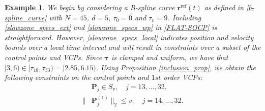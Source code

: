 \documentclass[journal,10pt]{IEEEtran}
\newtheorem{example}{\bfseries Example}%
\newcommand{\vect}[1]{\boldsymbol{\mathbf{#1}}}
\newif\ifdraft
\newcommand{\XX}[1]{\ifdraft{\color{red}[{\bf XX}: #1]}\fi}
\newcommand{\VF}[1]{\ifdraft{\color{blue}[{\bf VF}: #1]}\fi}
\begin{document}
\begin{example}
%

We begin by considering a B-spline curve $\vect{r}^{\text{ref}}(t)$ as defined in \eqref{b-spline_curve} with $N= 45$, $d=5$, $\tau_0 = 0$ and $\tau_v = 9$. Including \eqref{slowzone_specs_ext} and \eqref{slowzone_specs_wp} in \eqref{FLAT-SOCP} is straightforward. However, \eqref{slowzone_specs_local} indicates position and velocity bounds over a local time interval and will result in constraints over a subset of the control points and VCPs.
Since $\vect{\tau}$ is clamped and uniform, we have that $[3,6)\in[\tau_{18},\tau_{33}) = [2.85, 6.15)$. Using Proposition \ref{inclusion_prop}, we obtain the following constraints on the control points and $1st$ order VCPs:
\begin{align*}
  &\vect{P}_j \in S_v, \quad j=13,\dots, 32,\\
  \|&\vect{P}_j^{(1)}\|_2\leq \overline{v}, \quad j=14,\dots,32.
\end{align*}

\end{example}
\end{document}
